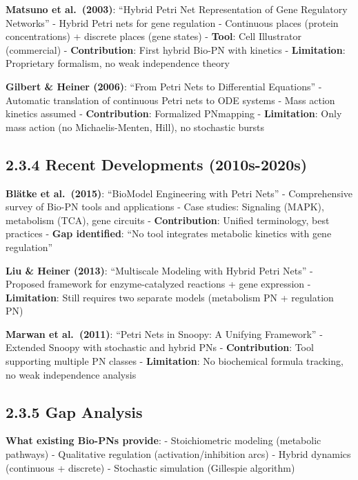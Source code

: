 \textbf{Matsuno et al.~(2003)}: ``Hybrid Petri Net Representation of
Gene Regulatory Networks'' - Hybrid Petri nets for gene regulation -
Continuous places (protein concentrations) + discrete places (gene
states) - \textbf{Tool}: Cell Illustrator (commercial) -
\textbf{Contribution}: First hybrid Bio-PN with kinetics -
\textbf{Limitation}: Proprietary formalism, no weak independence theory

\textbf{Gilbert \& Heiner (2006)}: ``From Petri Nets to Differential
Equations'' - Automatic translation of continuous Petri nets to ODE
systems - Mass action kinetics assumed - \textbf{Contribution}:
Formalized PN\textrightarrowODE mapping - \textbf{Limitation}: Only mass action (no
Michaelis-Menten, Hill), no stochastic bursts

\hypertarget{recent-developments-2010s-2020s}{%
\subsection{2.3.4 Recent Developments
(2010s-2020s)}\label{recent-developments-2010s-2020s}}

\textbf{Blätke et al.~(2015)}: ``BioModel Engineering with Petri Nets''
- Comprehensive survey of Bio-PN tools and applications - Case studies:
Signaling (MAPK), metabolism (TCA), gene circuits -
\textbf{Contribution}: Unified terminology, best practices - \textbf{Gap
identified}: ``No tool integrates metabolic kinetics with gene
regulation''

\textbf{Liu \& Heiner (2013)}: ``Multiscale Modeling with Hybrid Petri
Nets'' - Proposed framework for enzyme-catalyzed reactions + gene
expression - \textbf{Limitation}: Still requires two separate models
(metabolism PN + regulation PN)

\textbf{Marwan et al.~(2011)}: ``Petri Nets in Snoopy: A Unifying
Framework'' - Extended Snoopy with stochastic and hybrid PNs -
\textbf{Contribution}: Tool supporting multiple PN classes -
\textbf{Limitation}: No biochemical formula tracking, no weak
independence analysis

\hypertarget{gap-analysis}{%
\subsection{2.3.5 Gap Analysis}\label{gap-analysis}}

\textbf{What existing Bio-PNs provide}: - \checkmark Stoichiometric modeling
(metabolic pathways) - \checkmark Qualitative regulation (activation/inhibition
arcs) - \checkmark Hybrid dynamics (continuous + discrete) - \checkmark Stochastic
simulation (Gillespie algorithm)

